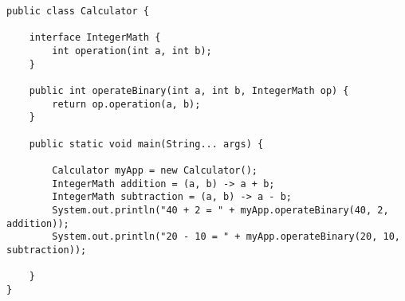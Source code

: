 \clearpage
\begin{lstlisting}
public class Calculator {
	
	interface IntegerMath {
		int operation(int a, int b);   
	}

	public int operateBinary(int a, int b, IntegerMath op) {
		return op.operation(a, b);
	}

	public static void main(String... args) {

		Calculator myApp = new Calculator();
		IntegerMath addition = (a, b) -> a + b;
		IntegerMath subtraction = (a, b) -> a - b;
		System.out.println("40 + 2 = " + myApp.operateBinary(40, 2, addition));
		System.out.println("20 - 10 = " + myApp.operateBinary(20, 10, subtraction));    
		
	}
}
\end{lstlisting}



								
